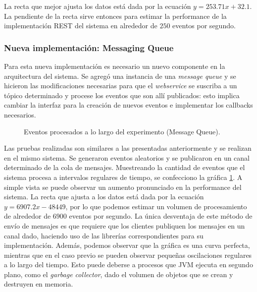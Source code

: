 \documentclass[a4paper,12pt, oneside]{article}
\begin{document}
La recta que mejor ajusta los datos está dada por la ecuación $y = 253.71 x + 32.1$. La pendiente de la recta sirve entonces para estimar la performance de la implementación REST del sistema en alrededor de $250$ eventos por segundo.

\subsubsection{Nueva implementación: Messaging Queue}
Para esta nueva implementación es necesario un nuevo componente en la arquitectura del sistema. Se agregó una instancia de una \textit{message queue} y se hicieron las modificaciones necesarias para que el \textit{webservice} se suscriba a un tópico determinado y procese los eventos que son allí publicados: esto implica cambiar la interfaz para la creación de nuevos eventos e implementar los callbacks necesarios.

\begin{figure}[h]
	\centering
	
	\caption{Eventos procesados a lo largo del experimento (Message Queue).} \label{fig:MQ}
\end{figure}

Las pruebas realizadas son similares a las presentadas anteriormente y se realizan en el mismo sistema. Se generaron eventos aleatorios y se publicaron en un canal determinado de la cola de mensajes. Muestreando la cantidad de eventos que el sistema procesa a intervalos regulares de tiempo, se confecciono la gráfica \ref{fig:MQ}. A simple vista se puede observar un aumento pronunciado en la performance del sistema. La recta que ajusta a los datos está dada por la ecuación $y = 6907.2 x - 48449$, por lo que podemos estimar un volumen de procesamiento de alrededor de $6900$ eventos por segundo. La única desventaja de este método de envío de mensajes es que requiere que los clientes publiquen los mensajes en un canal dado, haciendo uso de las librerías correspondientes para su implementación. Además, podemos observar que la gráfica es una curva perfecta, mientras que en el caso previo se pueden observar pequeñas oscilaciones regulares a lo largo del tiempo. Esto puede deberse a procesos que JVM ejecuta en segundo plano, como el \textit{garbage collector}, dado el volumen de objetos que se crean y destruyen en memoria.
\end{document}
